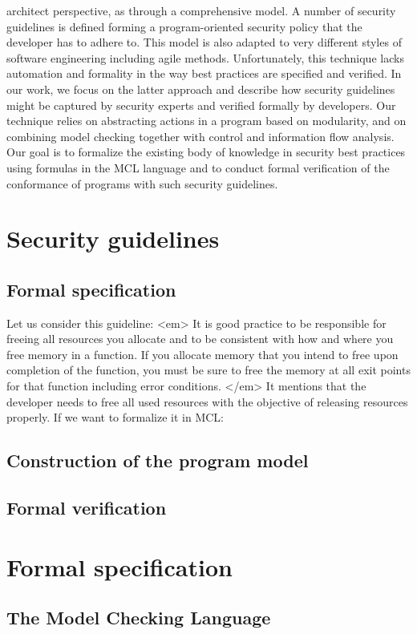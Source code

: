 \documentclass[10pt]{article}
\begin{document}
architect perspective, as through a comprehensive model. A number of security guidelines is
defined forming a program-oriented security policy that the developer has to adhere to. This
model is also adapted to very different styles of software engineering including agile methods.
Unfortunately, this technique lacks automation and formality in the way best practices are
specified and verified.
In our work, we focus on the latter approach and describe how security guidelines might
be captured by security experts and verified formally by developers. Our technique relies
on abstracting actions in a program based on modularity, and on combining model checking
together with control and information flow analysis. Our goal is to formalize the existing
body of knowledge in security best practices using formulas in the MCL language and to
conduct formal verification of the conformance of programs with such security guidelines.
\section{Security guidelines}
\subsection {Formal specification}
Let us consider this guideline:
<em> It is good practice to be responsible for freeing all resources you allocate and to be consistent with how and where you free memory in a function. If you allocate memory that you intend to free upon completion of the function, you must be sure to free the memory at all exit points for that function including error conditions.
 </em> \cite{https://cwe.mitre.org/data/definitions/404.html}
It mentions that the developer needs to free all used resources with the objective of releasing resources properly.
If we want to formalize it in MCL:


\subsection {Construction of the program model}
\subsection {Formal verification}
\section{Formal specification}
\subsection {The Model Checking Language}
\end{document}
